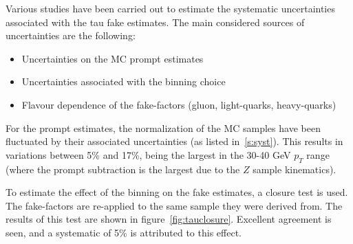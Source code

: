 Various studies have been carried out to estimate the systematic uncertainties associated
with the tau fake estimates.  The main considered sources of uncertainties are the following:

\begin{itemize}
\item Uncertainties on the MC prompt estimates
\item Uncertainties associated with the binning choice
\item Flavour dependence of the fake-factors (gluon, light-quarks, heavy-quarks)
\end{itemize}

For the prompt estimates, the normalization of the MC samples have been fluctuated by
their associated uncertainties (as listed in~\ref{s:syst}).  This results in variations
between 5\% and 17\%, being the largest in the 30-40 GeV $p_{T}$ range (where the prompt
subtraction is the largest due to the $Z$ sample kinematics).

To estimate the effect of the binning on the fake estimates, a closure test is used.  The
fake-factors are re-applied to the same sample they were derived from.  The results of
this test are shown in figure~\ref{fig:tauclosure}.  Excellent agreement is seen, and a
systematic of 5\% is attributed to this effect.

